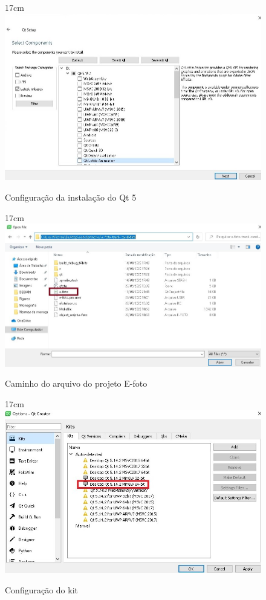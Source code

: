 \begin{figure}[!ht]{17cm}
 	\centering
	\includegraphics[width=12cm]{Figuras/qtinstallconfig.jpg}
	\caption{Configuração da instalação do Qt 5} \label{fig:qtinstallconfig}
\end{figure}

\begin{figure}[!ht]{17cm}
 	\centering
	\includegraphics[width=15cm]{Figuras/openpro.jpg}
	\caption{Caminho do arquivo do projeto E-foto} \label{fig:openpro}
\end{figure}

\begin{figure}[!ht]{17cm}
 	\centering
	\includegraphics[width=15cm]{Figuras/qtkit.jpg}
	\caption{Configuração do kit} \label{fig:qtkit}
\end{figure}

